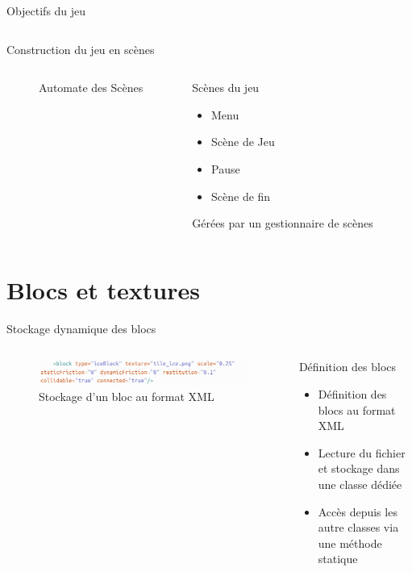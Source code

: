 \documentclass{beamer}
\begin{document}
{\begin{frame}{Objectifs du jeu}
\begin{columns}
    \end{columns}
\end{frame}

\begin{frame}{Construction du jeu en scènes}
    \begin{columns}
            \begin{figure}
                \centering
                
                \caption{Automate des Scènes}
            \end{figure}
            \begin{block}{Scènes du jeu}
                \begin{itemize}
                    \item[\bullet] Menu
                    \item[\bullet] Scène de Jeu
                    \item[\bullet] Pause
                    \item[\bullet] Scène de fin
                \end{itemize}
                Gérées par un gestionnaire de scènes
            \end{block}
    \end{columns}
\end{frame}

\section{Blocs et textures}
\begin{frame}{Stockage dynamique des blocs}
    \begin{columns}
            \begin{figure}
                \centering
                \includegraphics[width=1.0\textwidth]{XMLfile}
                \caption{Stockage d'un bloc au format XML}
            \end{figure}
            \begin{block}{Définition des blocs}
                \begin{itemize}
                    \item[\bullet] Définition des blocs au format XML
                    \item[\bullet] Lecture du fichier et stockage dans une classe dédiée
                    \item[\bullet] Accès depuis les autre classes via une méthode statique
                \end{itemize}
            \end{block}
    \end{columns}
\end{frame}

}
\end{document}

